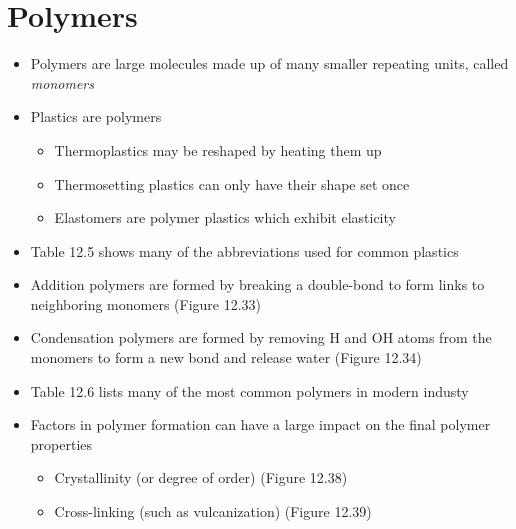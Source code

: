 \documentclass[12pt, openany, letterpaper]{memoir}
\begin{document}
\section{Polymers}
\begin{itemize}
  \item Polymers are large molecules made up of many smaller repeating units, called \emph{monomers}
  \item Plastics are polymers
  \begin{itemize}
    \item Thermoplastics may be reshaped by heating them up
    \item Thermosetting plastics can only have their shape set once
    \item Elastomers are polymer plastics which exhibit elasticity
  \end{itemize}
  \item Table 12.5 shows many of the abbreviations used for common plastics
  \item Addition polymers are formed by breaking a double-bond to form links to neighboring monomers (Figure 12.33)
  \item Condensation polymers are formed by removing H and OH atoms from the monomers to form a new bond and release water (Figure 12.34)
  \item Table 12.6 lists many of the most common polymers in modern industy 
  \item Factors in polymer formation can have a large impact on the final polymer properties
  \begin{itemize}
    \item Crystallinity (or degree of order) (Figure 12.38)
    \item Cross-linking (such as vulcanization) (Figure 12.39)
  \end{itemize}
\end{itemize}
\end{document}

